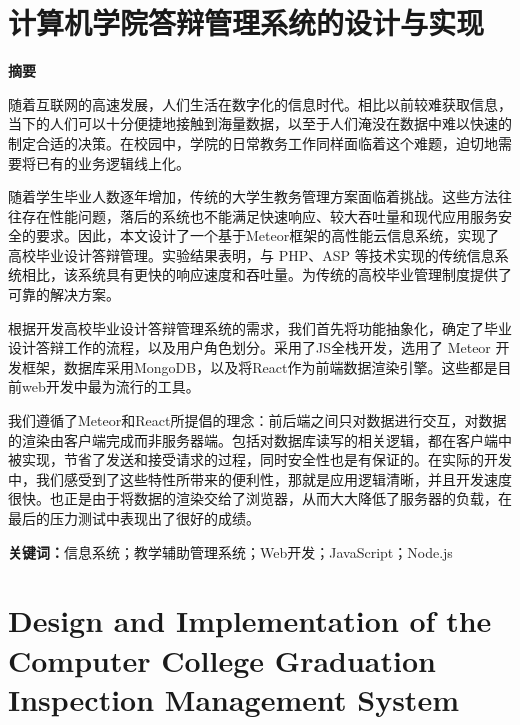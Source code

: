 \thispagestyle{abstractStyle} 

\section*{ \centering 计算机学院答辩管理系统的设计与实现}

\begin{center}
	\textbf{ 摘\hspace{1em}要}
\end{center}
\vspace{2em}

随着互联网的高速发展，人们生活在数字化的信息时代。相比以前较难获取信息，当下的人们可以十分便捷地接触到海量数据，以至于人们淹没在数据中难以快速的制定合适的决策。在校园中，学院的日常教务工作同样面临着这个难题，迫切地需要将已有的业务逻辑线上化。

随着学生毕业人数逐年增加，传统的大学生教务管理方案面临着挑战。这些方法往往存在性能问题，落后的系统也不能满足快速响应、较大吞吐量和现代应用服务安全的要求。因此，本文设计了一个基于Meteor框架的高性能云信息系统，实现了高校毕业设计答辩管理。实验结果表明，与 PHP、ASP 等技术实现的传统信息系统相比，该系统具有更快的响应速度和吞吐量。为传统的高校毕业管理制度提供了可靠的解决方案。

根据开发高校毕业设计答辩管理系统的需求，我们首先将功能抽象化，确定了毕业设计答辩工作的流程，以及用户角色划分。采用了JS全栈开发，选用了 Meteor 开发框架，数据库采用MongoDB，以及将React作为前端数据渲染引擎。这些都是目前web开发中最为流行的工具。

我们遵循了Meteor和React所提倡的理念：前后端之间只对数据进行交互，对数据的渲染由客户端完成而非服务器端。包括对数据库读写的相关逻辑，都在客户端中被实现，节省了发送和接受请求的过程，同时安全性也是有保证的。在实际的开发中，我们感受到了这些特性所带来的便利性，那就是应用逻辑清晰，并且开发速度很快。也正是由于将数据的渲染交给了浏览器，从而大大降低了服务器的负载，在最后的压力测试中表现出了很好的成绩。

\vspace{1em}
\noindent
\textbf{关键词：}信息系统；教学辅助管理系统；Web开发；JavaScript；Node.js


\clearpage
{}
\thispagestyle{abstractStyleEn} 

\section*{\songti{} \centering \textbf{Design and Implementation of the Computer College Graduation Inspection Management System}}

